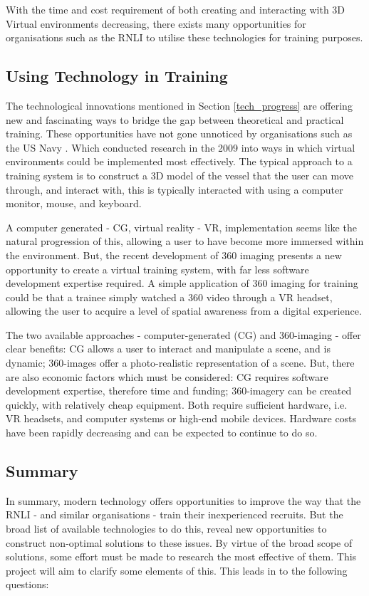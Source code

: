 \documentclass[ %
                    author={Elis Jones},
                supervisor={Dr. Kirsten Cater},
                    degree={BSc},
                     title={The Effect of Presentation Medium on Spatial Cognition},
                  subtitle={in the Virtual Environment},
                      year={2018} ]{dissertation}
\begin{document}
With the time and cost requirement of both creating and interacting with 3D Virtual environments decreasing, there exists many opportunities for organisations such as the RNLI to utilise these technologies for training purposes. 

\subsection{Using Technology in Training }
The technological innovations mentioned in Section \ref{tech_progress} are offering new and fascinating ways to bridge the gap between theoretical and practical training.  These opportunities have not gone unnoticed by organisations such as the US Navy \citep{hussein}. Which conducted research in the 2009 into ways in which virtual environments could be implemented most effectively. The typical approach to a training system is to construct a 3D model of the vessel that the user can move through, and interact with, this is typically interacted with using a computer monitor, mouse, and keyboard. 

A computer generated - CG, virtual reality - VR, implementation seems like the natural progression of this, allowing a user to have become more immersed within the environment. But, the recent development of 360 imaging presents a new opportunity to create a virtual training system, with far less software development expertise required. A simple application of 360 imaging for training could be that a trainee simply watched a 360 video through a VR headset, allowing the user to acquire a level of spatial awareness from a digital experience.

The two available approaches - computer-generated (CG) and 360-imaging - offer clear benefits: CG allows a user to interact and manipulate a scene, and is dynamic; 360-images offer a photo-realistic representation of a scene. But, there are also economic factors which must be considered: CG requires software development expertise, therefore time and funding; 360-imagery can be created quickly, with relatively cheap equipment. Both require sufficient hardware, i.e. VR headsets, and computer systems or high-end mobile devices.  Hardware costs have been rapidly decreasing and can be expected to continue to do so. 

\subsection{Summary}\label{tech-summary}
In summary, modern technology offers opportunities to improve the way that the RNLI - and similar organisations - train their inexperienced recruits. But the broad list of available technologies to do this, reveal new opportunities to construct non-optimal solutions to these issues. By virtue of the broad scope of solutions, some effort must be made to research the most effective of them. This project will aim to clarify some elements of this. This leads in to the following questions:
\end{document}
